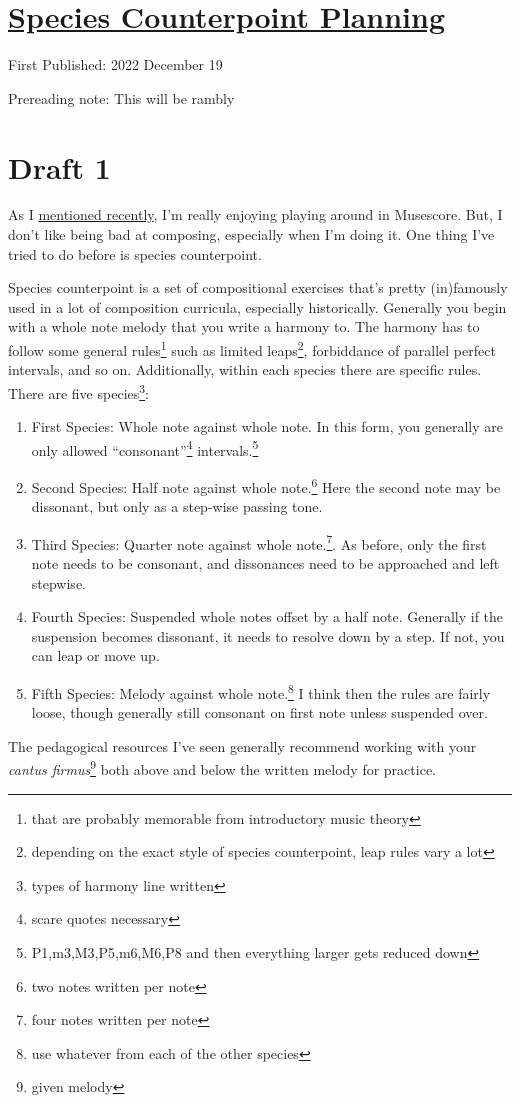 \documentclass[12pt]{article}[titlepage]
\newcommand{\say}[1]{``#1''}
\newcommand{\1}{\={a}}
\newcommand{\2}{\={e}}
\newcommand{\3}{\={\i}}
\newcommand{\4}{\=o}
\newcommand{\5}{\=u}
\newcommand{\6}{\={A}}
\renewcommand{\,}{\textsuperscript{,}}
\begin{document}
\doublespacing
\section{\href{species-counterpoint-planning.html}{Species Counterpoint Planning}}
First Published: 2022 December 19

Prereading note: This will be rambly

\section{Draft 1}
As I \href{musescore-4.html}{mentioned recently}, I'm really enjoying playing around in Musescore.
But, I don't like being bad at composing, especially when I'm doing it.
One thing I've tried to do before is species counterpoint.

Species counterpoint is a set of compositional exercises that's pretty (in)famously used in a lot of composition curricula, especially historically.
Generally you begin with a whole note melody that you write a harmony to.
The harmony has to follow some general rules\footnote{that are probably memorable from introductory music theory} such as limited leaps\footnote{depending on the exact style of species counterpoint, leap rules vary a lot}, forbiddance of parallel perfect intervals, and so on.
Additionally, within each species there are specific rules.
There are five species\footnote{types of harmony line written}:
\begin{enumerate}
\item First Species: Whole note against whole note.
In this form, you generally are only allowed \say{consonant}\footnote{scare quotes necessary} intervals.\footnote{P1,m3,M3,P5,m6,M6,P8 and then everything larger gets reduced down}
\item Second Species: Half note against whole note.\footnote{two notes written per note}
Here the second note may be dissonant, but only as a step-wise passing tone.
\item Third Species: Quarter note against whole note.\footnote{four notes written per note}.
As before, only the first note needs to be consonant, and dissonances need to be approached and left stepwise.
\item Fourth Species: Suspended whole notes offset by a half note.
Generally if the suspension becomes dissonant, it needs to resolve down by a step.
If not, you can leap or move up.
\item Fifth Species: Melody against whole note.\footnote{use whatever from each of the other species}
I think then the rules are fairly loose, though generally still consonant on first note unless suspended over.
\end{enumerate}
The pedagogical resources I've seen generally recommend working with your \textit{cantus firmus}\footnote{given melody} both above and below the written melody for practice.
\end{document}
